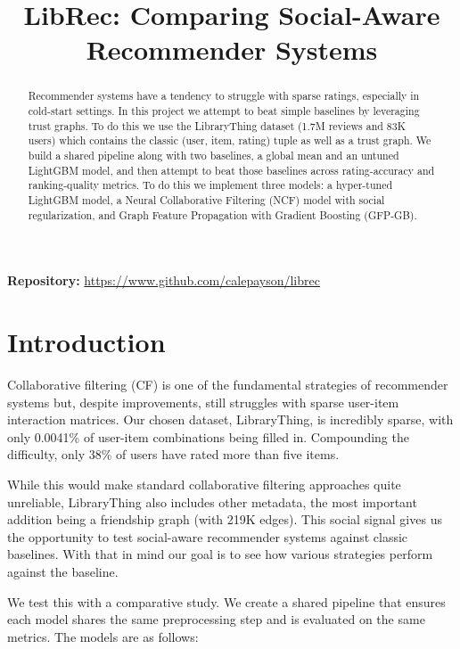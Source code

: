 \documentclass[conference]{IEEEtran}
\title{LibRec: Comparing Social-Aware Recommender Systems}
\author{
  \IEEEauthorblockN{Cale Smith, Advait Shinde, Jasper Morgal}
  \IEEEauthorblockA{Department of Computer Engineering\\
  San Jose State University\\
  San Jose, CA, USA\\
  \{cale.smith, advait.shinde, jasper.morgal\}@sjsu.edu}
}
\begin{document}
\maketitle

\begin{abstract}
Recommender systems have a tendency to struggle with sparse ratings, especially 
in cold-start settings. In this project we attempt to beat simple baselines by 
leveraging trust graphs. To do this we use the LibraryThing dataset (1.7M 
reviews and 83K users) which contains the classic (user, item, rating) tuple as 
well as a trust graph. We build a shared pipeline along with two baselines, a 
global mean and an untuned LightGBM model, and then attempt to beat those 
baselines across rating-accuracy and ranking-quality metrics. To do this we 
implement three models: a hyper-tuned LightGBM model, a Neural Collaborative 
Filtering (NCF) model with social regularization, and Graph Feature Propagation 
with Gradient Boosting (GFP-GB).
\end{abstract}

\noindent\textbf{Repository:} \url{https://www.github.com/calepayson/librec}

\section{Introduction}
\label{sec:intro}

Collaborative filtering (CF) is one of the fundamental strategies of 
recommender systems but, despite improvements, still struggles with sparse 
user-item interaction matrices. Our chosen dataset, LibraryThing, is incredibly
sparse, with only 0.0041\% of user-item combinations being filled in. 
Compounding the difficulty, only 38\% of users have rated more than five items.

While this would make standard collaborative filtering approaches quite
unreliable, LibraryThing also includes other metadata, the most important
addition being a friendship graph (with 219K edges). This social signal gives 
us the opportunity to test social-aware recommender systems against classic 
baselines. With that in mind our goal is to see how various strategies perform
against the baseline.

We test this with a comparative study. We create a shared pipeline that ensures
each model shares the same preprocessing step and is evaluated on the same
metrics. The models are as follows:
\end{document}
